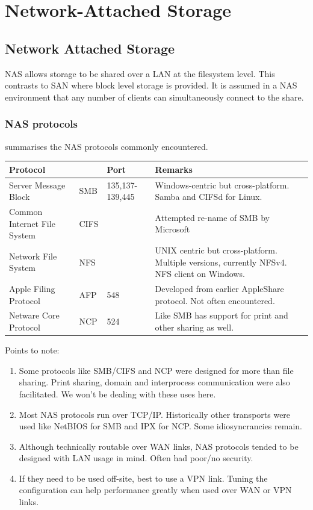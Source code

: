 \chapter{Network-Attached Storage}
\label{ch:network-attached-storage}

\section{Network Attached Storage}\label{network-attached-storage}

NAS allows storage to be shared over a LAN at the filesystem level. This
contrasts to SAN where block level storage is provided. It is assumed in
a NAS environment that any number of clients can simultaneously connect
to the share.

\subsection{NAS protocols}
\label{sec:nas-protocols}

summarises the NAS protocols commonly encountered.

\begin{table}[htbp]
  \begin{tabularx}{1.0\linewidth}{l l l X}
    \toprule
    \textbf{Protocol} & ~ & \textbf{Port} & \textbf{Remarks} \\
    \midrule
    Server Message Block & SMB & 135,137-139,445 & Windows-centric but cross-platform. Samba and CIFSd for Linux.\\
    Common Internet File System & CIFS & ~ & Attempted re-name of SMB by Microsoft\\
    Network File System & NFS & ~ & UNIX centric but cross-platform. Multiple versions, currently NFSv4. NFS client on Windows.\\
    Apple Filing Protocol & AFP & 548 & Developed from earlier AppleShare protocol. Not often encountered.\\
    Netware Core Protocol & NCP & 524 & Like SMB has support for print and other sharing as well.\\
    \bottomrule
  \end{tabularx}
\end{table}

Points to note:

\begin{enumerate}
\item
  Some protocols like SMB/CIFS and NCP were designed for more than file
  sharing. Print sharing, domain and interprocess communication were
  also facilitated. We won't be dealing with these uses here.
\item
  Most NAS protocols run over TCP/IP. Historically other transports were
  used like NetBIOS for SMB and IPX for NCP. Some idiosyncrancies
  remain.
\item
  Although technically routable over WAN links, NAS protocols tended to
  be designed with LAN usage in mind. Often had poor/no security.
\item
  If they need to be used off-site, best to use a VPN link. Tuning the
  configuration can help performance greatly when used over WAN or VPN
  links.
\end{enumerate}


